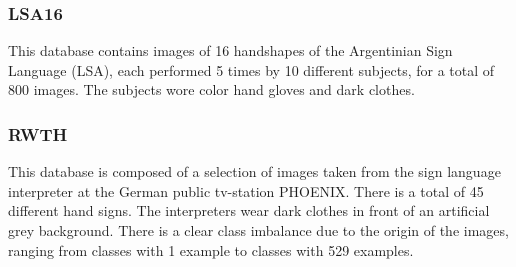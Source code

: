 
\subsubsection{LSA16}

This database contains images of 16 handshapes of the Argentinian Sign Language (LSA), each performed 5 times by 10 different subjects, for a total of 800 images. The subjects wore color hand gloves and dark clothes.

\subsubsection{RWTH}

This database is composed of a selection of images taken from the sign language interpreter at the German public tv-station PHOENIX. There is a total of 45 different hand signs. The interpreters wear dark clothes in front of an artificial grey background. There is a clear class imbalance due to the origin of the images, ranging from classes with 1 example to classes with 529 examples.